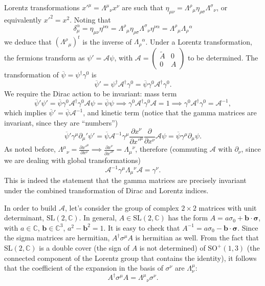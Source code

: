 \documentclass[a4paper,12pt]{book}
\renewcommand{\vec}{\mathbf}
\theoremstyle{definition}
\theoremstyle{remark}
\begin{document}
Lorentz transformations $x'^\mu=\Lambda^\mu{}_\nu x^\nu$ are such that $\eta_{\mu\nu}=\Lambda^\rho{}_\mu\eta_{\rho\sigma}\Lambda^\sigma{}_\nu$, or equivalently $x'^2=x^2$. Noting that
\[\delta_\mu^\alpha=\eta_{\mu\nu}\eta^{\nu\alpha}=\Lambda^\rho{}_\mu\eta_{\rho\sigma}\Lambda^\sigma{}_\nu\eta^{\nu\alpha}=\Lambda^\rho{}_\mu\Lambda_\rho{}^\alpha\]
we deduce that $(\Lambda^\rho{}_\mu)^t$ is the inverse of $\Lambda_\rho{}^\alpha$. Under a Lorentz transformation, the fermions transform as $\psi'=\mathcal A\psi$, with $\mathcal A=\begin{pmatrix}\tilde A& 0\\ 0& A\end{pmatrix}$ to be determined. The transformation of $\overline\psi=\psi^\dagger\gamma^0$ is
\[\overline\psi'=\psi^\dagger \mathcal A^\dagger\gamma^0=\overline\psi\gamma^0\mathcal A^\dagger\gamma^0.\]
We require the Dirac action to be invariant: mass term
\begin{equation}
\overline\psi'\psi'=\overline\psi\gamma^0\mathcal A^\dagger\gamma^0\mathcal A\psi=\overline\psi\psi\implies\gamma^0\mathcal A^\dagger\gamma^0\mathcal A=1\implies\gamma^0\mathcal A^\dagger\gamma^0=\mathcal A^{-1},
\label{eqn:Agammazero}
\end{equation}
which implies $\overline\psi'=\overline\psi\mathcal A^{-1}$, and kinetic term (notice that the gamma matrices are invariant, since they are ``numbers'')
\[\overline\psi'\gamma^\mu\partial_\mu'\psi'=\overline\psi\mathcal A^{-1}\gamma^\mu\frac{\partial x^\nu}{\partial x'^\mu}\frac{\partial}{\partial x^\nu}\mathcal A\psi=\overline\psi\gamma^\mu\partial_\mu\psi.\]
As noted before, $\Lambda^\mu{}_\nu=\frac{\partial x'^\mu}{\partial x^\nu}\implies \frac{\partial x^\nu}{\partial x'^\mu}=\Lambda_\mu{}^\nu$, therefore (commuting $\mathcal A$ with $\partial_\nu$, since we are dealing with global transformations)
\begin{equation}
\mathcal A^{-1}\gamma^\mu\Lambda_\mu{}^\nu\mathcal A=\gamma^\nu.
\label{eqn:AgammaLambda}
\end{equation}
This is indeed the statement that the gamma matrices are precisely invariant under the combined transformation of Dirac and Lorentz indices.

In order to build $\mathcal A$, let's consider the group of complex $2\times2$ matrices with unit determinant, $\text{SL}(2,\mathbb C)$. In general, $A\in\text{SL}(2,\mathbb C)$ has the form $A=a\sigma_0+\vec b\cdot\boldsymbol\sigma$, with $a\in\mathbb C$, $\vec b\in\mathbb C^3$, $a^2-\vec b^2=1$. It is easy to check that $A^{-1}=a\sigma_0-\vec b\cdot\boldsymbol\sigma$. Since the sigma matrices are hermitian, $A^\dagger\sigma^\mu A$ is hermitian as well. From the fact that $\text{SL}(2,\mathbb C)$ is a double cover (the sign of $A$ is not determined) of $\text{SO}^+(1,3)$ (the connected component of the Lorentz group that contains the identity), it follows that the coefficient of the expansion in the basis of $\sigma^\nu$ are $\Lambda^\mu_\nu$:
\begin{equation}
A^\dagger\sigma^\mu A=\Lambda^\mu{}_\nu\sigma^\nu.
\label{eqn:ALambda}
\end{equation}
\end{document}
